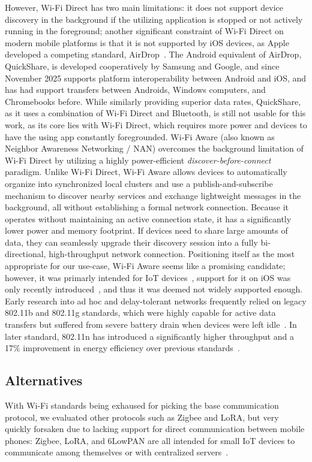 However, Wi-Fi Direct has two main limitations: it does not support device discovery in the background if the utilizing application is stopped or not actively running in the foreground; another significant constraint of Wi-Fi Direct on modern mobile platforms is that it is not supported by iOS devices, as Apple developed a competing standard, AirDrop~\cite{airdrop}.
The Android equivalent of AirDrop, QuickShare, is developed cooperatively by Samsung and Google, and since November 2025 supports platform interoperability between Android and iOS, and has had support transfers between Androids, Windows computers, and Chromebooks before.
While similarly providing superior data rates, QuickShare, as it uses a combination of Wi-Fi Direct and Bluetooth, is still not usable for this work, as its core lies with Wi-Fi Direct, which requires more power and devices to have the using app constantly foregrounded.
Wi-Fi Aware (also known as Neighbor Awareness Networking / NAN) overcomes the background limitation of Wi-Fi Direct by utilizing a highly power-efficient \textit{discover-before-connect} paradigm.
Unlike Wi-Fi Direct, Wi-Fi Aware allows devices to automatically organize into synchronized local clusters and use a publish-and-subscribe mechanism to discover nearby services and exchange lightweight messages in the background, all without establishing a formal network connection.
Because it operates without maintaining an active connection state, it has a significantly lower power and memory footprint.
If devices need to share large amounts of data, they can seamlessly upgrade their discovery session into a fully bi-directional, high-throughput network connection.
Positioning itself as the most appropriate for our use-case, Wi-Fi Aware seems like a promising candidate; however, it was primarly intended for IoT devices~\cite{Saloni2016}, support for it on iOS was only recently introduced~\cite{WWDC25}, and thus it was deemed not widely supported enough.
Early research into ad hoc and delay-tolerant networks frequently relied on legacy 802.11b and 802.11g standards, which were highly capable for active data transfers but suffered from severe battery drain when devices were left idle~\cite{Ott2006}.
In later standard, 802.11n has introduced a significantly higher throughput and a 17\% improvement in energy efficiency over previous standards~\cite{Friedman2013}.

\subsection{Alternatives}
With Wi-Fi standards being exhaused for picking the base communication protocol, we evaluated other protocols such as Zigbee and LoRA, but very quickly forsaken due to lacking support for direct communication between mobile phones: Zigbee, LoRA, and 6LowPAN are all intended for small IoT devices to communicate among themselves or with centralized servers~\cite{Saloni2016}.

